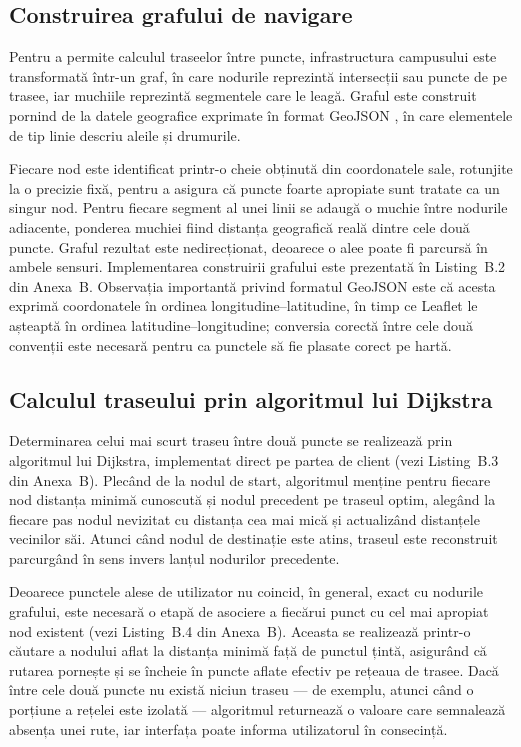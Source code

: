 \subsection{Construirea grafului de navigare}
\label{subsec:graf}

Pentru a permite calculul traseelor între puncte, infrastructura campusului
este transformată într-un graf, în care nodurile reprezintă intersecții sau
puncte de pe trasee, iar muchiile reprezintă segmentele care le leagă.
Graful este construit pornind de la datele geografice exprimate în format
GeoJSON \cite{GeoJSON}, în care elementele de tip linie descriu aleile și
drumurile.

Fiecare nod este identificat printr-o cheie obținută din coordonatele sale,
rotunjite la o precizie fixă, pentru a asigura că puncte foarte apropiate
sunt tratate ca un singur nod. Pentru fiecare segment al unei linii se
adaugă o muchie între nodurile adiacente, ponderea muchiei fiind distanța
geografică reală dintre cele două puncte. Graful rezultat este
nedirecționat, deoarece o alee poate fi parcursă în ambele sensuri.
Implementarea construirii grafului este prezentată în Listing~B.2 din
Anexa~B. Observația importantă privind formatul GeoJSON este că acesta
exprimă coordonatele în ordinea longitudine–latitudine, în timp ce Leaflet le
așteaptă în ordinea latitudine–longitudine; conversia corectă între cele două
convenții este necesară pentru ca punctele să fie plasate corect pe hartă.

\subsection{Calculul traseului prin algoritmul lui Dijkstra}
\label{subsec:dijkstra}

Determinarea celui mai scurt traseu între două puncte se realizează prin
algoritmul lui Dijkstra, implementat direct pe partea de client (vezi
Listing~B.3 din Anexa~B). Plecând de la nodul de start, algoritmul menține
pentru fiecare nod distanța minimă cunoscută și nodul precedent pe traseul
optim, alegând la fiecare pas nodul nevizitat cu distanța cea mai mică și
actualizând distanțele vecinilor săi. Atunci când nodul de destinație este
atins, traseul este reconstruit parcurgând în sens invers lanțul nodurilor
precedente.

Deoarece punctele alese de utilizator nu coincid, în general, exact cu
nodurile grafului, este necesară o etapă de asociere a fiecărui punct cu cel
mai apropiat nod existent (vezi Listing~B.4 din Anexa~B). Aceasta se
realizează printr-o căutare a nodului aflat la distanța minimă față de
punctul țintă, asigurând că rutarea pornește și se încheie în puncte aflate
efectiv pe rețeaua de trasee. Dacă între cele două puncte nu există niciun
traseu — de exemplu, atunci când o porțiune a rețelei este izolată —
algoritmul returnează o valoare care semnalează absența unei rute, iar
interfața poate informa utilizatorul în consecință.

